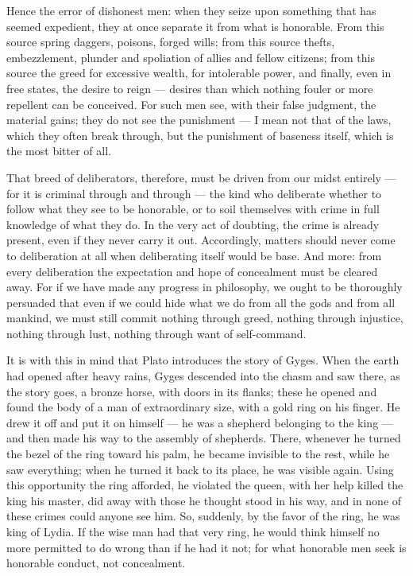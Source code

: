  Hence the error of dishonest men: when they seize upon something that has seemed expedient, they at once separate it from what is honorable. From this source spring daggers, poisons, forged wills; from this source thefts, embezzlement, plunder and spoliation of allies and fellow citizens; from this source the greed for excessive wealth, for intolerable power, and finally, even in free states, the desire to reign — desires than which nothing fouler or more repellent can be conceived. For such men see, with their false judgment, the material gains; they do not see the punishment — I mean not that of the laws, which they often break through, but the punishment of baseness itself, which is the most bitter of all.

 That breed of deliberators, therefore, must be driven from our midst entirely — for it is criminal through and through — the kind who deliberate whether to follow what they see to be honorable, or to soil themselves with crime in full knowledge of what they do. In the very act of doubting, the crime is already present, even if they never carry it out. Accordingly, matters should never come to deliberation at all when deliberating itself would be base. And more: from every deliberation the expectation and hope of concealment must be cleared away. For if we have made any progress in philosophy, we ought to be thoroughly persuaded that even if we could hide what we do from all the gods and from all mankind, we must still commit nothing through greed, nothing through injustice, nothing through lust, nothing through want of self-command.

 It is with this in mind that Plato introduces the story of Gyges. When the earth had opened after heavy rains, Gyges descended into the chasm and saw there, as the story goes, a bronze horse, with doors in its flanks; these he opened and found the body of a man of extraordinary size, with a gold ring on his finger. He drew it off and put it on himself — he was a shepherd belonging to the king — and then made his way to the assembly of shepherds. There, whenever he turned the bezel of the ring toward his palm, he became invisible to the rest, while he saw everything; when he turned it back to its place, he was visible again. Using this opportunity the ring afforded, he violated the queen, with her help killed the king his master, did away with those he thought stood in his way, and in none of these crimes could anyone see him. So, suddenly, by the favor of the ring, he was king of Lydia. If the wise man had that very ring, he would think himself no more permitted to do wrong than if he had it not; for what honorable men seek is honorable conduct, not concealment.

